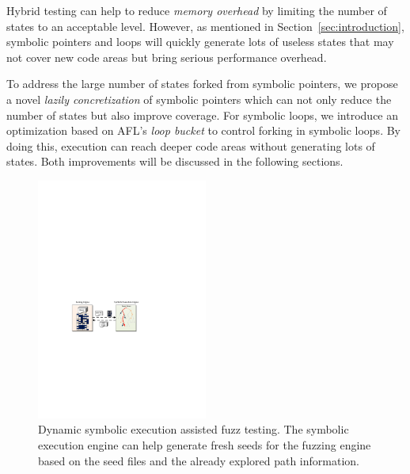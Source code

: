 Hybrid testing can help to reduce \textit{memory overhead} by 
limiting the number of states to an acceptable level. However, 
as mentioned in Section~\ref{sec:introduction}, symbolic pointers 
and loops will quickly generate lots of useless states that may 
not cover new code areas but bring serious performance overhead.

To address the large number of states forked from symbolic pointers, 
we propose a novel \textit{lazily concretization} of symbolic 
pointers which can not only reduce the number of states but also 
improve coverage. 
For symbolic loops, we introduce an optimization based on AFL's 
\textit{loop bucket} to control forking in symbolic loops. By 
doing this, execution can reach deeper code areas without 
generating lots of states. Both improvements will be discussed 
in the following sections.

\begin{figure}
\centering
\includegraphics[width=0.5\textwidth]{figures/s2e-assist.pdf} 
\caption{Dynamic symbolic execution assisted fuzz testing. The 
	symbolic execution engine can help generate fresh seeds for 
	the fuzzing engine based on the seed files 	and the already 
	explored path information.}\label{s2e-assist}
\end{figure}

